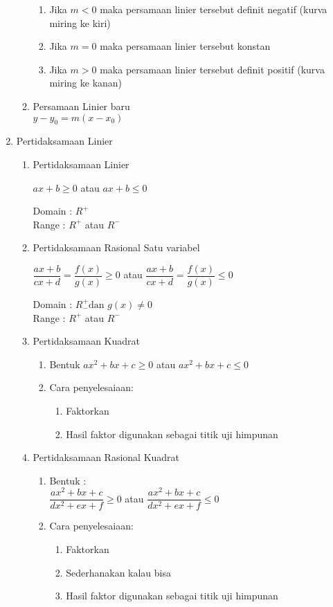 \begin{enumerate}
\begin{enumerate}
					\begin{enumerate}
						\item Jika $m<0$ maka persamaan linier tersebut definit negatif (kurva miring ke kiri)
						\item Jika $m=0$ maka persamaan linier tersebut konstan
						\item Jika $m>0$ maka persamaan linier tersebut definit positif (kurva miring ke kanan)
					\end{enumerate} 
					\item Persamaan Linier baru\\
					$y-y_0=m(x-x_0)$
				\end{enumerate}
			\item Pertidaksamaan Linier
				\begin{enumerate}
					\item Pertidaksamaan Linier\\
					\begin{center}
						$ax+b\geq 0$ atau $ax+b\leq 0$
					\end{center}
					Domain : $R^+$\\
					Range  : $R^+$ atau $R^-$
					
					\item Pertidaksamaan Rasional Satu variabel
					
					\begin{center}
						$\dfrac{ax+b}{cx+d}=\dfrac{f(x)}{g(x)}\geq 0$ atau
						$\dfrac{ax+b}{cx+d}=\dfrac{f(x)}{g(x)}\leq 0$ 
					\end{center}
					Domain : $R^+_- \text{dan }g(x)\neq0$\\
					Range : $R^+$ atau $R^-$
					\item Pertidaksamaan Kuadrat
					\begin{enumerate}
						\item Bentuk 
						$ax^2+bx+c\geq 0$ atau $ax^2+bx+c\leq 0$
						\item Cara penyelesaiaan:
						\begin{enumerate}
							\item Faktorkan
							\item Hasil faktor digunakan sebagai titik uji himpunan
						\end{enumerate}
					\end{enumerate}
					
					\item Pertidaksamaan Rasional Kuadrat
					\begin{enumerate}
						\item Bentuk :\\
						$\dfrac{ax^2+bx+c}{dx^2+ex+f}\geq 0$ atau $\dfrac{ax^2+bx+c}{dx^2+ex+f}\leq 0$
						\item Cara penyelesaiaan:
						\begin{enumerate}
							\item Faktorkan
							\item Sederhanakan kalau bisa
							\item Hasil faktor digunakan sebagai titik uji himpunan
						\end{enumerate}
					\end{enumerate}
							

\end{enumerate}
\end{enumerate}
